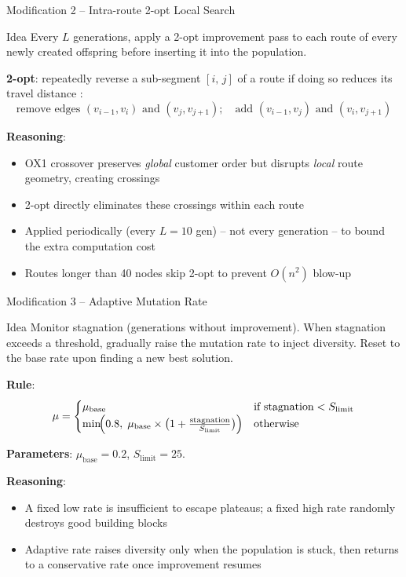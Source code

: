 \documentclass[aspectratio=169]{beamer}
\begin{document}
\begin{frame}{Modification 2 -- Intra-route 2-opt Local Search}
  \begin{block}{Idea}
    Every $L$ generations, apply a 2-opt improvement pass to each route
    of every newly created offspring before inserting it into the population.
  \end{block}

  \vspace{4pt}
  \textbf{2-opt}: repeatedly reverse a sub-segment $[i,\,j]$ of a route if
  doing so reduces its travel distance \cite{lin1965computer}:
  \[
    \text{remove edges } (v_{i-1}, v_i)\text{ and }(v_j, v_{j+1});
    \quad\text{add } (v_{i-1}, v_j)\text{ and }(v_i, v_{j+1})
  \]

  \vspace{4pt}
  \textbf{Reasoning}:
  \begin{itemize}
    \item OX1 crossover preserves \emph{global} customer order but disrupts
          \emph{local} route geometry, creating crossings
    \item 2-opt directly eliminates these crossings within each route
    \item Applied periodically (every $L=10$ gen) -- not every generation --
          to bound the extra computation cost
    \item Routes longer than 40 nodes skip 2-opt to prevent $O(n^2)$ blow-up
  \end{itemize}
\end{frame}

\begin{frame}{Modification 3 -- Adaptive Mutation Rate}
  \begin{block}{Idea}
    Monitor stagnation (generations without improvement).  When stagnation
    exceeds a threshold, gradually raise the mutation rate to inject
    diversity.  Reset to the base rate upon finding a new best solution.
  \end{block}

  \vspace{4pt}
  \textbf{Rule}:
  \[
    \mu =
    \begin{cases}
      \mu_{\text{base}} & \text{if stagnation} < S_{\text{limit}} \\
      \min\!\Bigl(0.8,\;\mu_{\text{base}} \times
        \bigl(1 + \tfrac{\text{stagnation}}{S_{\text{limit}}}\bigr)\Bigr)
        & \text{otherwise}
    \end{cases}
  \]

  \textbf{Parameters}: $\mu_{\text{base}} = 0.2$,\; $S_{\text{limit}} = 25$.

  \vspace{4pt}
  \textbf{Reasoning}:
  \begin{itemize}
    \item A fixed low rate is insufficient to escape plateaus; a fixed high
          rate randomly destroys good building blocks
    \item Adaptive rate raises diversity only when the population is stuck,
          then returns to a conservative rate once improvement resumes
  \end{itemize}
\end{frame}
\end{document}
